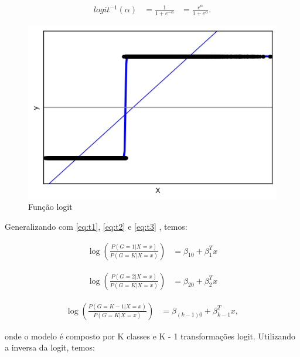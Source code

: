 \begin{equation}
  \label{eq:t}
  \begin{aligned}
    logit^{-1}(\alpha) &= \frac{1}{1+e^{-\alpha}} &= \frac{e^{\alpha}}{1+e^{\alpha}}.
  \end{aligned}
\end{equation}

\begin{figure}[!ht]
\caption{Fun\c c\~ao logit}
\centerline{\includegraphics[width=.6\textwidth]{img/logit}}
\end{figure}


Generalizando com \ref{eq:t1}, \ref{eq:t2} e \ref{eq:t3} , temos:

\begin{equation}
  \label{eq:t1}
  \begin{aligned}
    \log\left ( \frac{P(G = 1 | X = x)}{P(G = K | X = x)} \right ) &= \beta_{10}+\beta_{1}^{T}x
  \end{aligned}
\end{equation}

\begin{equation}
  \label{eq:t2}
  \begin{aligned}
    \log\left ( \frac{P(G = 2 | X = x)}{P(G = K | X = x)} \right ) &= \beta_{20}+\beta_{2}^{T}x
  \end{aligned}
\end{equation}

\begin{equation}
  \label{eq:t3}
  \begin{aligned}
    \log\left ( \frac{P(G = K-1 | X = x)}{P(G = K | X = x)} \right ) &= \beta_{(k-1)0}+\beta_{k-1}^{T}x,
  \end{aligned}
\end{equation}

onde o modelo é composto por K classes e K - 1 transformações logit. Utilizando a inversa da logit, temos:

